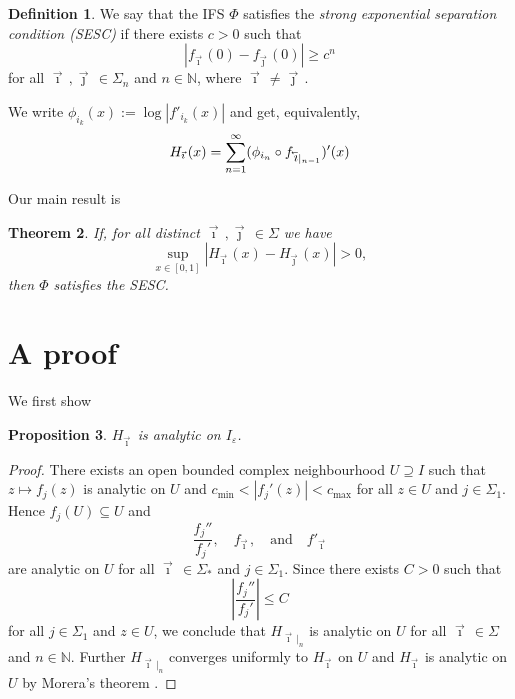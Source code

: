 \documentclass[12pt,]{article}
\newtheorem{theorem}{Theorem}[section]
\newtheorem{proposition}[theorem]{Proposition}
\theoremstyle{definition}
\newtheorem{definition}[theorem]{Definition}
\theoremstyle{remark}
\renewcommand{\Bbb}[1]{\mathbb{#1}}
\newcommand{\bbN}{{\Bbb N}}         %
\newcommand{\0}{\mathbf{0}}
\newcommand{\eps}{\varepsilon}
\newcommand{\cev}[1]{\reflectbox{\ensuremath{\vec{\reflectbox{\ensuremath{#1}}}}}}
\newcommand{\bi}{\vec{\imath}\,}
\newcommand{\bj}{\vec{\jmath}\,}
\newcommand{\bbi}{\,\cev{\imath}}
\begin{document}
\begin{definition}
  We say that the IFS $\Phi$ satisfies the \emph{strong exponential separation condition (SESC)} if
  there exists $c>0$ such that
  \[
    |f_{\bi}(0)-f_{\bj}(0)| \geq c^n
  \]
  for all $\bi,\bj\in\Sigma_n$ and $n\in\bbN$, where $\bi\neq\bj$.
\end{definition}

We write $\phi_{i_k}(x):= \log|f'_{i_k}(x)|$ and get, equivalently,
\begin{equation}
  H_{\bi}(x) = \sum_{n=1}^\infty (\phi_{i_n}\circ f_{\bbi|_{n-1}})'(x)
  \label{eq:alternativeH}
\end{equation}

Our main result is
\begin{theorem}
  \label{thm:main}
  If, for all distinct $\bi,\bj \in\Sigma$ we have
  \[
    \sup_{x\in[0,1]} |H_{\bi}(x) - H_{\bj}(x)| > 0,
  \]
  then $\Phi$ satisfies the SESC.
\end{theorem}






\section{A proof}\label{sec:proof}
We first show
\begin{proposition}
  $H_{\bi}$ is analytic on $I_{\eps}$.
\end{proposition}
\begin{proof}
  There exists an open bounded complex neighbourhood $U \supseteq I$ such that
  $z\mapsto f_j(z)$ is analytic on $U$ and $c_{\min}<|f_j'(z)|<c_{\max}$ for all $z\in U$ and $j\in\Sigma_1$.
  Hence $f_j(U) \subseteq U$ and
  \[
    \frac{f_j''}{f_j'},\quad f_{\bi}, \quad\text{and} \quad f'_{\bi}
  \]
  are analytic on $U$ for all $\bi\in\Sigma_*$ and $j\in\Sigma_1$.
  Since there exists $C>0$ such that
  \[
\left|\frac{f_j''}{f_j'}\right| \leq C
  \]
  for all $j\in\Sigma_1$ and $z\in U$, we conclude that $H_{\bi|_n}$ is analytic on $U$ for
  all $\bi\in\Sigma$ and $n\in\bbN$. Further $H_{\bi|_n}$ converges uniformly to $H_{\bi}$ on $U$
and $H_{\bi}$ is analytic on $U$ by Morera's theorem \cite[Theorem 10.17]{Rudin87}.
\end{proof}
\end{document}
